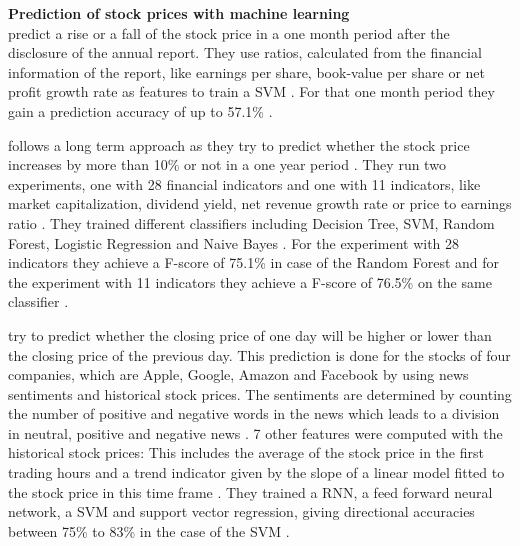 \textbf{Prediction of stock prices with machine learning} \\
\cite{Heo2016} predict a rise or a fall of the stock price in a one month period after the disclosure of the annual report.
They use ratios, calculated from the financial information of the report, like earnings per share, book-value per share or net profit growth rate as features to train a \ac{SVM} \cite[p. 61]{Heo2016}.
For that one month period they gain a prediction accuracy of up to 57.1\% \cite[p. 63]{Heo2016}.

\cite{Milosevic2016} follows a long term approach as they try to predict whether the stock price increases by more than 10\% or not in a one year period \cite[pp. 4-5]{Milosevic2016}.
They run two experiments, one with 28 financial indicators and one with 11 indicators, like market capitalization, dividend yield, net revenue growth rate or price to earnings ratio \cite[pp. 3-4]{Milosevic2016}.
They trained different classifiers including Decision Tree, \ac{SVM}, Random Forest, Logistic Regression and Naive Bayes \cite[p. 5]{Moukalled2019}.
For the experiment with 28 indicators they achieve a F-score of 75.1\% in case of the Random Forest and for the experiment with 11 indicators they achieve a F-score of 76.5\% on the same classifier \cite[p. 7]{Milosevic2016}.

\cite{Moukalled2019} try to predict whether the closing price of one day will be higher or lower than the closing price of the previous day.
This prediction is done for the stocks of four companies, which are Apple, Google, Amazon and Facebook by using news sentiments and historical stock prices.
The sentiments are determined by counting the number of positive and negative words in the news which leads to a division in neutral, positive and negative news \cite[p. 5]{Moukalled2019}.
7 other features were computed with the historical stock prices:
This includes the average of the stock price in the first trading hours and a trend indicator given by the slope of a linear model fitted to the stock price in this time frame \cite[p. 5]{Moukalled2019}.
They trained a \ac{RNN}, a feed forward neural network, a \ac{SVM} and support vector regression, giving directional accuracies between 75\% to 83\% in the case of the \ac{SVM} \cite[p. 8]{Moukalled2019}.

